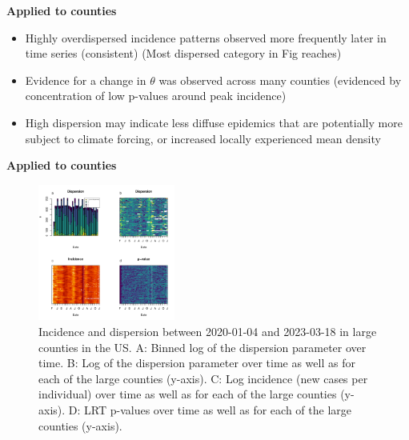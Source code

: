 \documentclass{beamer}
\begin{document}
\begin{frame}{\textbf{Applied to counties}}
	\begin{itemize}[<+-| alert@+>]
		\item Highly overdispersed incidence patterns observed more frequently later in time series (consistent) (Most dispersed category in Fig reaches) 
		\item Evidence for a change in \begin{math}\theta\end{math} was observed across many counties (evidenced by concentration of low p-values around peak incidence) 
		\item High dispersion may indicate less diffuse epidemics that are potentially more subject to climate forcing\cite{dalziel_urbanization_2018}, or increased locally experienced mean density \cite{lloyd_mean_1967}
	\end{itemize}
\end{frame}

\begin{frame}{\textbf{Applied to counties}}
	\begin{figure}[!h]
	\includegraphics[width=0.4\textwidth]{fig2}
	\caption{
		Incidence and dispersion between 2020-01-04 and 2023-03-18 in large counties in the US. A: Binned log of the dispersion parameter over time. B: Log of the dispersion parameter over time as well as for each of the large counties (y-axis). C: Log incidence (new cases per individual) over time as well as for each of the large counties (y-axis). D: LRT p-values over time as well as for each of the large counties (y-axis).
	}
	\label{fig2}
\end{figure}
\end{frame}
\end{document}
